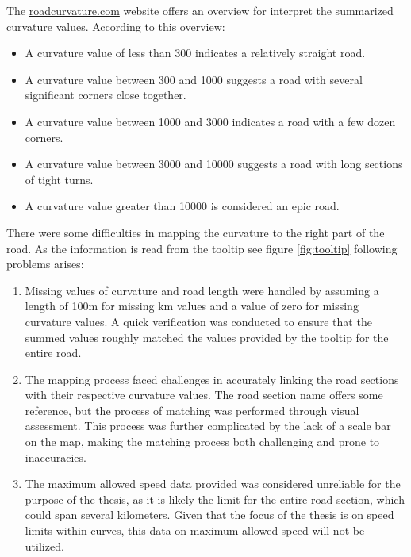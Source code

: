 The \hyperlink{}{roadcurvature.com} website offers an overview for interpret the summarized curvature values. According to this overview:
\begin{itemize}
    \item A curvature value of less than 300 indicates a relatively straight road.
    \item A curvature value between 300 and 1000 suggests a road with several significant corners close together.
    \item A curvature value between 1000 and 3000 indicates a road with a few dozen corners.
    \item A curvature value between 3000 and 10000 suggests a road with long sections of tight turns.
    \item A curvature value greater than 10000 is considered an epic road.
\end{itemize}

There were some difficulties in mapping the curvature to the right part of the road. As the information is read from the tooltip see figure \ref{fig:tooltip} following problems arises:
\begin{enumerate}
    \item Missing values of curvature and road length were handled by assuming a length of 100m for missing km values and a value of zero for missing curvature values. A quick verification was conducted to ensure that the summed values roughly matched the values provided by the tooltip for the entire road. 
    \item The mapping process faced challenges in accurately linking the road sections with their respective curvature values. The road section name offers some reference, but the process of matching was performed through visual assessment. This process was further complicated by the lack of a scale bar on the map, making the matching process both challenging and prone to inaccuracies.
    \item The maximum allowed speed data provided was considered unreliable for the purpose of the thesis, as it is likely the limit for the entire road section, which could span several kilometers. Given that the focus of the thesis is on speed limits within curves, this data on maximum allowed speed will not be utilized.
\end{enumerate}

